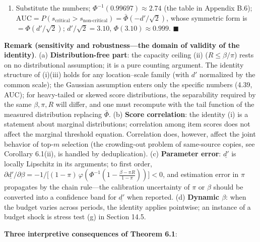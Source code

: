 \documentclass[
  11pt]{article}
\providecommand{\tightlist}{%
  \setlength{\itemsep}{0pt}\setlength{\parskip}{0pt}}
\begin{document}
\begin{enumerate}
\def\labelenumi{(\roman{enumi})}
\setcounter{enumi}{3}
\tightlist
\item
  Substitute the numbers; \(\Phi^{-1}(0.99697) \approx 2.74\) (the table
  in Appendix B.6);
  \(\mathrm{AUC} = P(s_{\text{critical}} > s_{\text{non-critical}}) = \bar\Phi(-d'/\sqrt{2})\),
  whose symmetric form is \(= \Phi(d'/\sqrt2)\); \(d'/\sqrt2 = 3.10\),
  \(\Phi(3.10) \approx 0.999\). \(\blacksquare\)
\end{enumerate}

\textbf{Remark (sensitivity and robustness---the domain of validity of
the identity)}. (a) \textbf{Distribution-free part}: the capacity
ceiling (ii) (\(R \le \beta/\pi\)) rests on no distributional
assumption; it is a pure counting argument. The identity structure of
(i)(iii) holds for any location--scale family (with \(d'\) normalized by
the common scale); the Gaussian assumption enters only the specific
numbers (4.39, AUC); for heavy-tailed or skewed score distributions, the
separability required by the same \(\beta, \pi, R\) will differ, and one
must recompute with the tail function of the measured distribution
replacing \(\bar\Phi\). (b) \textbf{Score correlation}: the identity (i)
is a statement about marginal distributions; correlation among item
scores does not affect the marginal threshold equation. Correlation
does, however, affect the joint behavior of top-\(m\) selection (the
crowding-out problem of same-source copies, see Corollary 6.1(ii), is
handled by deduplication). (c) \textbf{Parameter error}:
\(\underline{d'}\) is locally Lipschitz in its arguments; to first
order,
\(\partial\underline{d'}/\partial\beta = -1/\big[(1-\pi)\,\varphi(\Phi^{-1}(1-\frac{\beta-\pi R}{1-\pi}))\big] < 0\),
and estimation error in \(\pi\) propagates by the chain rule---the
calibration uncertainty of \(\pi\) or \(\beta\) should be converted into
a confidence band for \(\underline{d'}\) when reported. (d)
\textbf{Dynamic \(\beta\)}: when the budget varies across periods, the
identity applies pointwise; an instance of a budget shock is stress test
(g) in Section 14.5.

\textbf{Three interpretive consequences of Theorem 6.1}:
\end{document}
